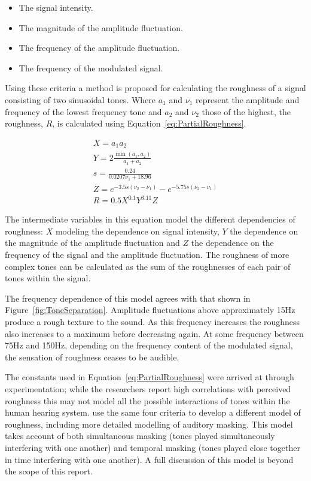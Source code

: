 		\begin{itemize}
			\item The signal intensity.
			\item The magnitude of the amplitude fluctuation.
			\item The frequency of the amplitude fluctuation.
			\item The frequency of the modulated signal.
		\end{itemize}

		Using these criteria a method is proposed for calculating the roughness of a signal consisting of two
		sinusoidal tones. Where $a_{1}$ and $\nu_{1}$ represent the amplitude and frequency of the lowest frequency
		tone and $a_{2}$ and $\nu_{2}$ those of the highest, the roughness, $R$, is calculated using
		Equation~\ref{eq:PartialRoughness}.
		
		\begin{gather}
			X = a_{1}a_{2} \nonumber \\
			Y = 2\frac{\min(a_{1}, a_{2})}{a_{1} + a_{2}} \nonumber \\
			s = \frac{0.24}{0.0207\nu_{1} + 18.96} \nonumber \\
			Z = e^{-3.5s(\nu_{2} - \nu_{1})} - e^{-5.75s(\nu_{2} - \nu_{1})} \nonumber \\
			R = 0.5X^{0.1}Y^{3.11}Z
			\label{eq:PartialRoughness}
		\end{gather}

		The intermediate variables in this equation model the different dependencies of roughness: $X$ modeling the
		dependence on signal intensity, $Y$ the dependence on the magnitude of the amplitude fluctuation and $Z$
		the dependence on the frequency of the signal and the amplitude fluctuation. The roughness of more complex
		tones can be calculated as the sum of the roughnesses of each pair of tones within the signal. 
		
		The frequency dependence of this model agrees with that shown in Figure~\ref{fig:ToneSeparation}. Amplitude
		fluctuations above approximately 15Hz produce a rough texture to the sound. As this frequency increases the
		roughness also increases to a maximum before decreasing again. At some frequency between 75Hz and 150Hz,
		depending on the frequency content of the modulated signal, the sensation of roughness ceases to be
		audible.

		The constants used in Equation~\ref{eq:PartialRoughness} were arrived at through experimentation; while the
		researchers report high correlations with perceived roughness this may not model all the possible
		interactions of tones within the human hearing system. \citet{fastl2007psychoacoustics} use the same four
		criteria to develop a different model of roughness, including more detailed modelling of auditory masking.
		This model takes account of both simultaneous masking (tones played simultaneously interfering with one
		another) and temporal masking (tones played close together in time interfering with one another). A full
		discussion of this model is beyond the scope of this report.

